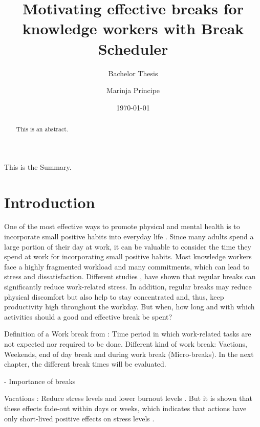 \documentclass{hasel_thesis}
\date{\today}
\title{Motivating effective breaks for knowledge workers with Break  Scheduler }
\subtitle{Bachelor Thesis}
\author{Marinja Principe}
\begin{document}
\maketitle

\frontmatter

\begin{acknowledgements}
\end{acknowledgements}

\begin{abstract}
This is an abstract.
\end{abstract}

\begin{Summary}
This is the Summary.
\end{Summary}
    

\tableofcontents
\listoffigures
\listoftables
\lstlistoflistings

\mainmatter
\chapter{Introduction}
One of the most effective ways to promote physical and mental health is to incorporate small positive habits  into everyday life \cite{Taylor.2005}. Since many adults spend a large portion of their day at work, it can be valuable to consider the time they spend at work for incorporating small positive habits. Most knowledge workers face a highly fragmented workload and many commitments, which can lead to stress and dissatisfaction. Different studies \cite{Largo-Wight.2017},\cite{KimS.ParkY.&Niu.2017} have shown that regular breaks can significantly reduce work-related stress.  In addition, regular breaks may reduce physical discomfort \cite{Waongenngarm.2018} but also help to stay concentrated \cite{Ariga.2011} \cite{Bloom.2014} and, thus, keep productivity high throughout the workday. 
But when, how long and with which activities should a good and effective break be spent? 

Definition of a Work break from \cite{Trougakos.2009}: Time period in which work-related tasks are not expected nor required to be done.
Different kind of work break: Vactions, Weekends, end of day break and during work break (Micro-breaks).
In the next chapter, the different break times will be evaluated.


- Importance of breaks

Vacations \cite{Trougakos.2009}:
Reduce stress levels and lower burnout levels \cite{Westman.2001}. But it is shown that these effects fade-out within days or weeks, which indicates that actions have only short-lived positive effects on stress levels \cite{Fritz.2006}.
\end{document}
